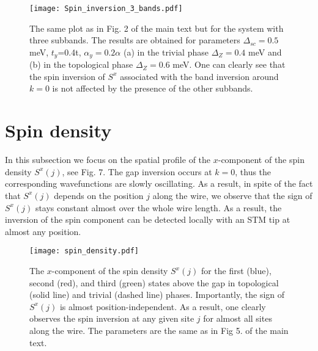 \documentclass[prl,twocolumn,showpacs,floatfix,amsbsy,amsbsy,superscriptaddress]{revtex4-1}
\begin{document}
\begin{figure}[ht]
\centering
\texttt{[image: Spin\_inversion\_3\_bands.pdf]}
\caption{The same plot as in Fig. 2 of the main text but for the system with three subbands. The results are obtained for parameters $\Delta_{sc}=0.5$ meV, $t_y$=0.4t, $\alpha_y=0.2\alpha$  (a) in the trivial phase $\Delta_{Z}=0.4$ meV and (b) in the topological phase $\Delta_{Z}=0.6$ meV. One can clearly see that the spin inversion of $S^x$ associated with the band inversion around $k=0$ is not affected by the presence of the other subbands.}
  \label{fig:Fig11}
\end{figure}


\section{Spin density}
In this subsection we focus on the spatial profile of the $x$-component of the spin density $S^x(j)$, see Fig. 7. The gap inversion occurs at $k=0$, thus the corresponding wavefunctions are slowly oscillating. As a result, in spite of the fact that $S^x(j)$ depends on the position $j$ along the wire, we observe that the sign of $S^x(j)$ stays constant almost over the whole wire length. As a result, the inversion of the spin component can be detected locally with an STM tip at almost any position.

\begin{figure}[ht]
\centering
\texttt{[image: spin\_density.pdf]}
\caption{The $x$-component of the spin density $S^x(j)$ for the first (blue), second (red), and third (green) states above the gap in topological (solid line) and trivial (dashed line) phases. Importantly, the sign of $S^x(j)$ is almost position-independent. As a result, one clearly observes the spin inversion at any given site $j$ for almost all sites along the wire.
The parameters are the same as in Fig 5. of the main text.}
\label{fig:Fig12}
\end{figure}
\end{document}
